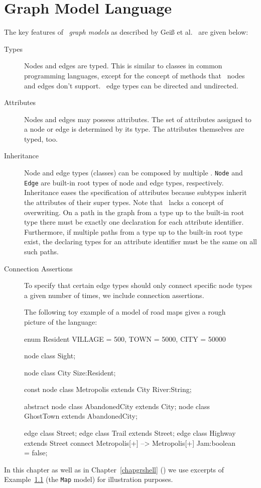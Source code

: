 \chapter{Graph Model Language}
\label{chapmodellang}
The key features of \GrG\ \emph{graph models} as described by Geiß et al.~\cite{GBGHS:06,KG:07} are given below:

\begin{description}
\item[Types] Nodes and edges are typed.
  This is similar to classes in common programming languages, except for the concept of methods that \GrG\ nodes and edges don't support. \GrG\ edge types can be directed and undirected.
\item[Attributes] Nodes and edges may possess attributes. The set of attributes assigned to a node or edge is determined by its type. The attributes themselves are typed, too.
\item[Inheritance] Node and edge types (classes) can be composed by multiple . \texttt{Node} and \texttt{Edge} are built-in root types of node and edge types, respectively. Inheritance eases the specification of attributes because subtypes inherit the attributes of their super types. Note that \GrG\ lacks a concept of overwriting. On a path in the  graph from a type up to the built-in root type there must be exactly one declaration for each attribute identifier. Furthermore, if multiple paths from a type up to the built-in root type exist, the declaring types for an attribute identifier must be the same on all such paths.
\item[Connection Assertions] To specify that certain edge types should only connect specific node types a given number of times, we include connection assertions.
\end{description}

\begin{figure}[htbf]
\begin{example}\label{ex:model:map}
The following toy example of a model of road maps gives a rough picture of the language:
\begin{grgen}
enum Resident {VILLAGE = 500, TOWN = 5000, CITY = 50000}

node class Sight;

node class City {
  Size:Resident;
}

const node class Metropolis extends City {
  River:String;
}

abstract node class AbandonedCity extends City;
node class GhostTown extends AbandonedCity;

edge class Street;
edge class Trail extends Street;
edge class Highway extends Street
    connect Metropolis[+] --> Metropolis[+]
{
    Jam:boolean = false;
}
\end{grgen}
\end{example}
\end{figure}
In this chapter as well as in Chapter~\ref{chapgrshell} (\GrShell) we use excerpts of Example~\ref{ex:model:map} (the \texttt{Map} model) for illustration purposes.


